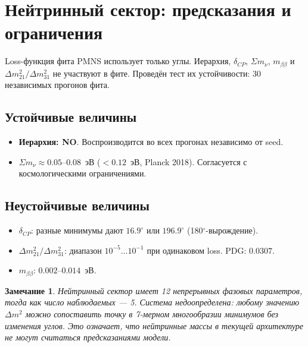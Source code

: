 \documentclass[11pt,a4paper]{article}
\numberwithin{equation}{section}
\newtheorem{remark}[theorem]{Замечание}
\begin{document}
\section{Нейтринный сектор: предсказания и ограничения}

Loss-функция фита PMNS использует только углы.
Иерархия, $\delta_{CP}$, $\Sigma m_\nu$, $m_{\beta\beta}$
и $\Delta m^2_{21}/\Delta m^2_{31}$ не участвуют
в фите. Проведён тест их устойчивости: 30 независимых
прогонов фита.

\subsection{Устойчивые величины}

\begin{itemize}[leftmargin=1.5em,itemsep=0.1em]
\item \textbf{Иерархия: NO}. Воспроизводится во всех
      прогонах независимо от seed.
\item $\Sigma m_\nu \approx 0.05$--$0.08$~эВ
      ($< 0.12$~эВ, Planck 2018). Согласуется с
      космологическими ограничениями.
\end{itemize}

\subsection{Неустойчивые величины}

\begin{itemize}[leftmargin=1.5em,itemsep=0.1em]
\item $\delta_{CP}$: разные минимумы дают $16.9^\circ$
      или $196.9^\circ$ (180$^\circ$-вырождение).
\item $\Delta m^2_{21}/\Delta m^2_{31}$: диапазон
      $10^{-5}\ldots 10^{-1}$ при одинаковом loss.
      PDG: $0.0307$.
\item $m_{\beta\beta}$: $0.002$--$0.014$~эВ.
\end{itemize}

\begin{remark}
Нейтринный сектор имеет 12 непрерывных фазовых
параметров, тогда как число наблюдаемых --- 5.
Система недоопределена: любому значению $\Delta m^2$
можно сопоставить точку в 7-мерном многообразии
минимумов без изменения углов. Это означает, что
нейтринные массы в текущей архитектуре не могут
считаться предсказаниями модели.
\end{remark}
\end{document}
